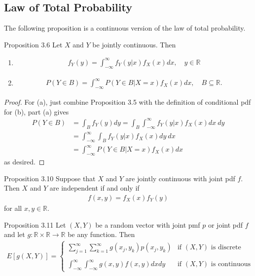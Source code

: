 \subsection{Law of Total Probability}
The following proposition is a continuous version of the law of total probability.

\begin{boks}{Proposition 3.6}
Let $X$ and $Y$ be jointly continuous. Then
\begin{enumerate}
    \item
    \begin{align*}
        f_Y(y) = \int_{-\infty}^\infty f_Y(y|x)f_X(x)dx, \quad y\in\mathbb{R}
    \end{align*}
    \item
    \begin{align*}
        P(Y \in B) = \int_{-\infty}^\infty P(Y \in B|X = x)f_X(x)dx, \quad B\subseteq\mathbb{R}.
    \end{align*}
\end{enumerate}
\end{boks}

\begin{proof}
For (a), just combine Proposition 3.5 with the definition of conditional pdf for (b), part (a) gives
\begin{align*}
    P(Y \in B) &= \int_B f_Y(y)dy = \int_B \int_{-\infty}^\infty f_Y(y|x)f_X(x)dx \ dy \\
    &= \int_{-\infty}^\infty \int_B f_Y(y|x)f_X(x)dy \ dx \\
    &= \int_{-\infty}^\infty P(Y \in B|X = x) f_X(x)dx
\end{align*}
as desired.
\end{proof}

\begin{boks}{Proposition 3.10}
Suppose that $X$ and $Y$ are jointly continuous with joint pdf $f$. Then $X$ and $Y$ are independent if and only if
\begin{align*}
    f(x, y) = f_X(x)f_Y(y)
\end{align*}
for all $x,y \in \mathbb{R}$.
\end{boks}

\begin{boks}{Proposition 3.11}
  Let $(X, Y)$ be a random vector with joint pmf $p$ or joint pdf $f$ and let $g:\mathbb{R} \times \mathbb{R} \rightarrow \mathbb{R}$ be any function. Then
  \begin{align*}
    E[g(X, Y)] =
    \begin{cases}
      \displaystyle\sum_{j = 1}^\infty \sum_{k = 1}^\infty g(x_j, y_k) p(x_j, y_k) &\text{if $(X,Y)$ is discrete} \\ \\
      \displaystyle\int_{-\infty}^\infty \int_{-\infty}^\infty g(x,y) f(x,y) dx dy &\text{if $(X, Y)$ is continuous}
    \end{cases}
  \end{align*}
\end{boks}

